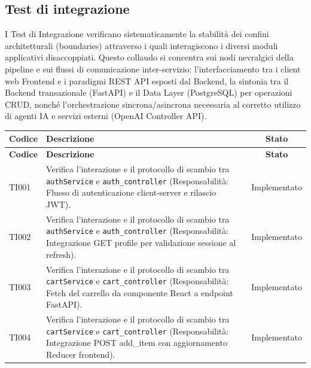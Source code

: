 \documentclass[a4paper,11pt,oneside]{scrartcl}
\begin{document}
\subsection{Test di integrazione}
I Test di Integrazione verificano sistematicamente la stabilità dei confini architetturali (boundaries) attraverso i quali interagiscono i diversi moduli applicativi disaccoppiati. Questo collaudo si concentra sui nodi nevralgici della pipeline e sui flussi di comunicazione inter-servizio: l'interfacciamento tra i client web Frontend e i paradigmi REST API esposti dal Backend, la sintonia tra il Backend transazionale (FastAPI) e il Data Layer (PostgreSQL) per operazioni CRUD, nonché l'orchestrazione sincrona/asincrona necessaria al corretto utilizzo di agenti IA e servizi esterni (OpenAI Controller API).
\begin{longtable}{|p{1.9cm}|p{11.6cm}|c|}
    \hline
    \rowcolor[gray]{0.9}
    \textbf{Codice} & \textbf{Descrizione}                                                                                                                                                                                       & \textbf{Stato} \\
    \hline
    \endfirsthead
    \hline
    \rowcolor[gray]{0.9}
    \textbf{Codice} & \textbf{Descrizione}                                                                                                                                                                                       & \textbf{Stato} \\
    \hline
    \endhead
    TI001           & Verifica l'interazione e il protocollo di scambio tra \texttt{authService} e \texttt{auth\_controller} (Responsabilità: Flusso di autenticazione client-server e rilascio JWT).                            & Implementato   \\ \hline
    TI002           & Verifica l'interazione e il protocollo di scambio tra \texttt{authService} e \texttt{auth\_controller} (Responsabilità: Integrazione GET profile per validazione sessione al refresh).                     & Implementato   \\ \hline
    TI003           & Verifica l'interazione e il protocollo di scambio tra \texttt{cartService} e \texttt{cart\_controller} (Responsabilità: Fetch del carrello da componente React a endpoint FastAPI).                        & Implementato   \\ \hline
    TI004           & Verifica l'interazione e il protocollo di scambio tra \texttt{cartService} e \texttt{cart\_controller} (Responsabilità: Integrazione POST add\_item con aggiornamento Reducer frontend).                   & Implementato   \\ \hline

\end{longtable}
\end{document}
